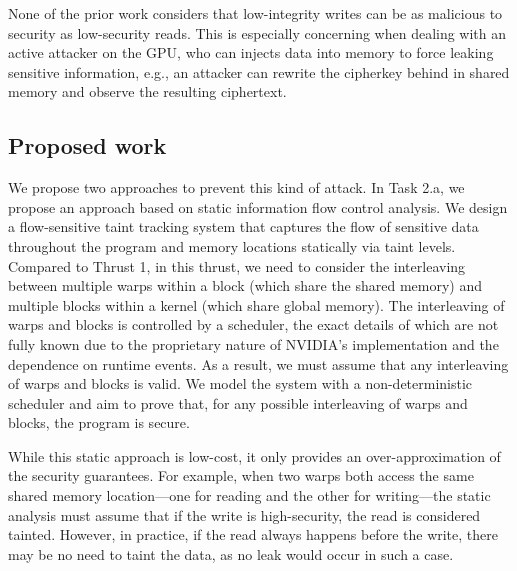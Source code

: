 
None of the prior work considers that low-integrity writes can be as malicious to security as low-security reads.
%
This is especially concerning when dealing with an active attacker on the GPU, who can injects data into memory to force leaking sensitive information,  e.g., an attacker can rewrite the cipherkey behind in shared memory and observe the resulting ciphertext.


\subsection{Proposed work}
We propose two approaches to prevent this kind of attack.
%
In Task 2.a, we propose an approach based on static information flow control analysis.
%
We design a flow-sensitive taint tracking system that captures the flow of sensitive data throughout the program and memory locations statically via taint levels.
%
Compared to Thrust 1, in this thrust, we need to consider the interleaving between multiple warps within a block (which share the shared memory) and multiple blocks within a kernel (which share global memory).
%
The interleaving of warps and blocks is controlled by a scheduler, the exact details of which are not fully known due to the proprietary nature of NVIDIA's implementation and the dependence on runtime events.
% 
As a result, we must assume that any interleaving of warps and blocks is valid.
% 
We model the system with a non-deterministic scheduler and aim to prove that, for any possible interleaving of warps and blocks, the program is secure.

While this static approach is low-cost, it only provides an over-approximation of the security guarantees. 
% 
For example, when two warps both access the same shared memory location—one for reading and the other for writing—the static analysis must assume that if the write is high-security, the read is considered tainted. 
% 
However, in practice, if the read always happens before the write, there may be no need to taint the data, as no leak would occur in such a case.

